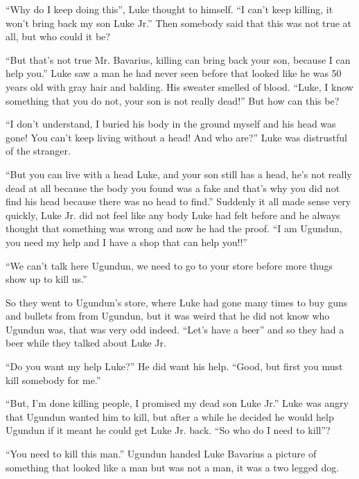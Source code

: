 ``Why do I keep doing this'', Luke thought to himself.
``I can't keep killing, it won't bring back my son Luke
Jr.'' Then somebody said that this was not true at all, but
who could it be?



``But that's not true Mr. Bavarius, killing can bring back
your son, because I can help you.'' Luke saw a man he had
never seen before that looked like he was 50 years old with gray
hair and balding. His sweater smelled of blood. ``Luke, I know
something that you do not, your son is not really dead!'' But
how can this be?



``I don't understand, I buried his body in the ground myself
and his head was gone! You can't keep living without a head! And
who are?'' Luke was distrustful of the stranger.



``But you can live with a head Luke, and your son still has a
head, he's not really dead at all because the body you found was a
fake and that's why you did not find his head because there was no
head to find.'' Suddenly it all made sense very quickly, Luke
Jr. did not feel like any body Luke had felt before and he always
thought that something was wrong and now he had the proof. ``I
am Ugundun, you need my help and I have a shop that can help
you!!''



``We can't talk here Ugundun, we need to go to your store
before more thugs show up to kill us.''



So they went to Ugundun's store, where Luke had gone many times to
buy guns and bullets from from Ugundun, but it was weird that he
did not know who Ugundun was, that was very odd indeed.
``Let's have a beer'' and so they had a beer while they
talked about Luke Jr.



``Do you want my help Luke?'' He did want his help.
``Good, but first you must kill somebody for me.''



``But, I'm done killing people, I promised my dead son Luke
Jr.'' Luke was angry that Ugundun wanted him to kill, but
after a while he decided he would help Ugundun if it meant he could
get Luke Jr. back. ``So who do I need to kill''?



``You need to kill this man.'' Ugundun handed Luke
Bavarius a picture of something that looked like a man but was not
a man, it was a two legged dog.



